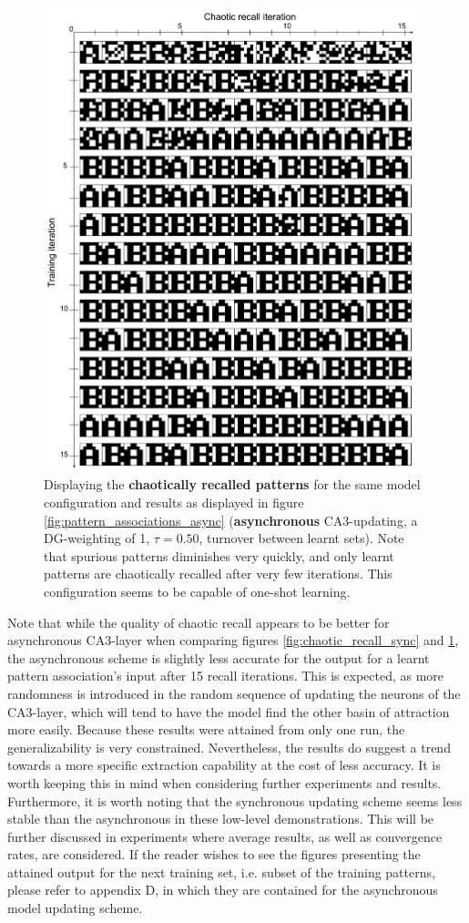 \begin{figure}
    \centering
    \includegraphics[width=11cm]{fig/AB-chaotic-recall-async-tm0-dgw1-tau050}
    \caption{Displaying the \textbf{chaotically recalled patterns} for the same model configuration and results as displayed in figure \ref{fig:pattern_associations_async} (\textbf{asynchronous} CA3-updating, a DG-weighting of 1, $\tau=0.50$, turnover between learnt sets). Note that spurious patterns diminishes very quickly, and only learnt patterns are chaotically recalled after very few iterations. This configuration seems to be capable of one-shot learning.}
    \label{fig:chaotic_recall_async}
\end{figure}

Note that while the quality of chaotic recall appears to be better for asynchronous CA3-layer when comparing figures \ref{fig:chaotic_recall_sync} and \ref{fig:chaotic_recall_async}, the asynchronous scheme is slightly less accurate for the output for a learnt pattern association's input after 15 recall iterations. This is expected, as more randomness is introduced in the random sequence of updating the neurons of the CA3-layer, which will tend to have the model find the other basin of attraction more easily. Because these results were attained from only one run, the generalizability is very constrained. Nevertheless, the results do suggest a trend towards a more specific extraction capability at the cost of less accuracy. It is worth keeping this in mind when considering further experiments and results. Furthermore, it is worth noting that the synchronous updating scheme seems less stable than the asynchronous in these low-level demonstrations. This will be further discussed in experiments where average results, as well as convergence rates, are considered. If the reader wishes to see the figures presenting the attained output for the next training set, i.e. subset of the training patterns, please refer to appendix D, in which they are contained for the asynchronous model updating scheme.

